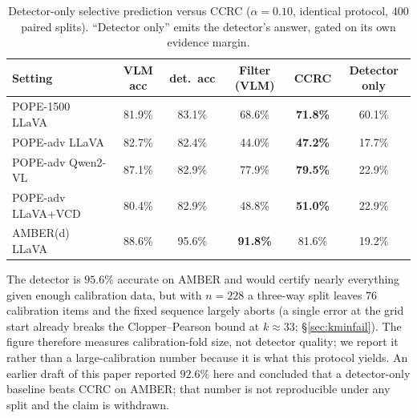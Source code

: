 \documentclass{article}
\theoremstyle{plain}
\theoremstyle{definition}
\theoremstyle{remark}
\begin{document}
\begin{table}
\begin{threeparttable}[t]
\centering
\caption{Detector-only selective prediction versus CCRC ($\alpha=0.10$, identical protocol,
$400$ paired splits). ``Detector only'' emits the detector's answer, gated on its own evidence
margin.}
\label{tab:baselines}
\begin{tabular}{lccccc}
\toprule
Setting & VLM acc & det.\ acc & Filter (VLM) & CCRC & Detector only\\
\midrule
POPE-1500 LLaVA    & 81.9\% & 83.1\% & 68.6\% & \textbf{71.8\%} & 60.1\%\\
POPE-adv LLaVA     & 82.7\% & 82.4\% & 44.0\% & \textbf{47.2\%} & 17.7\%\\
POPE-adv Qwen2-VL  & 87.1\% & 82.9\% & 77.9\% & \textbf{79.5\%} & 22.9\%\\
POPE-adv LLaVA+VCD & 80.4\% & 82.9\% & 48.8\% & \textbf{51.0\%} & 22.9\%\\
AMBER(d) LLaVA     & 88.6\% & 95.6\% & \textbf{91.8\%} & 81.6\% & 19.2\%\rlap{$^{\dagger}$}\\
\bottomrule
\end{tabular}
\begin{tablenotes}[flushleft]\footnotesize
\item[$\dagger$] The detector is $95.6\%$ accurate on AMBER and would certify nearly everything
given enough calibration data, but with $n=228$ a three-way split leaves $76$ calibration items
and the fixed sequence largely aborts (a single error at the grid start already breaks the
Clopper--Pearson bound at $k\approx33$; \S\ref{sec:kminfail}). The figure therefore measures
calibration-fold size, not detector quality; we report it rather than a large-calibration number
because it is what this protocol yields. An earlier draft of this paper reported $92.6\%$ here
and concluded that a detector-only baseline beats CCRC on AMBER; that number is not reproducible
under any split and the claim is withdrawn.
\end{tablenotes}

\end{threeparttable}
\end{table}
\end{document}
